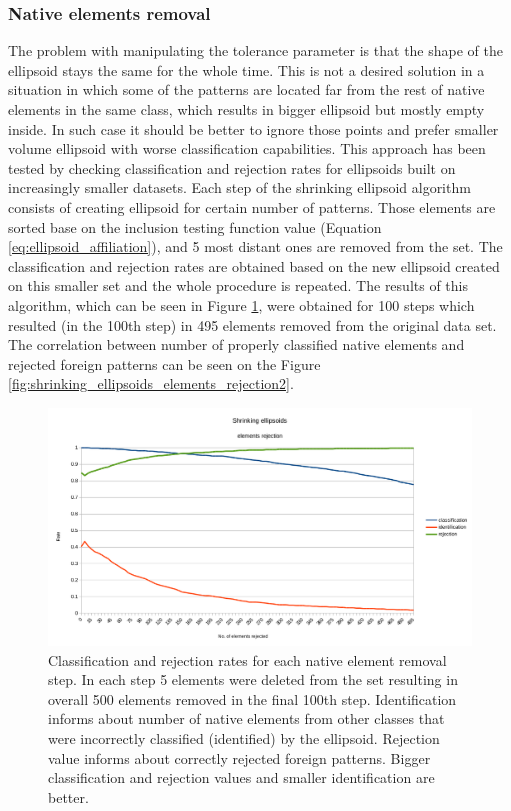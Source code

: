 \subsubsection{Native elements removal}

The problem with manipulating the tolerance parameter is that the shape of the ellipsoid stays the same for the whole time. This is not a desired solution in a situation in which some of the patterns are located far from the rest of native elements in the same class, which results in bigger ellipsoid but mostly empty inside. In such case it should be better to ignore those points and prefer smaller volume ellipsoid with worse classification capabilities. This approach has been tested by checking classification and rejection rates for ellipsoids built on increasingly smaller datasets. Each step of the shrinking ellipsoid algorithm consists of creating ellipsoid for certain number of patterns. Those elements are sorted base on the inclusion testing function value (Equation \ref{eq:ellipsoid_affiliation}), and 5 most distant ones are removed from the set. The classification and rejection rates are obtained based on the new ellipsoid created on this smaller set and the whole procedure is repeated. The results of this algorithm, which can be seen in Figure \ref{fig:shrinking_ellipsoids_elements_rejection}, were obtained for 100 steps which resulted (in the 100th step) in 495 elements removed from the original data set. The correlation between number of properly classified native elements and rejected foreign patterns can be seen on the Figure \ref{fig:shrinking_ellipsoids_elements_rejection2}.

\begin{figure}[htp]
	\centering
	\includegraphics[width=1.\textwidth]{Figures/shrinking_ellipsoid_elements_rejection.png}
	\caption{ Classification and rejection rates for each native element removal step. In each step 5 elements were deleted from the set resulting in overall 500 elements removed in the final 100th step. Identification informs about number of native elements from other classes that were incorrectly classified (identified) by the ellipsoid. Rejection value informs about correctly rejected foreign patterns. Bigger classification and rejection values and smaller identification are better. }
	\label{fig:shrinking_ellipsoids_elements_rejection}\vspace{-3pt}
\end{figure}


